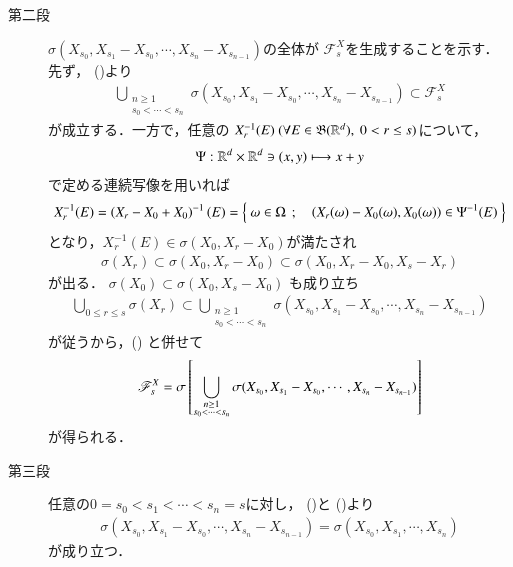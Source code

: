 \begin{prf}
\begin{description}
		\item[第二段]
			$\sigma(X_{s_0},X_{s_1}-X_{s_0},\cdots,X_{s_n} - X_{s_{n-1}})$の全体が
			$\mathscr{F}^X_s$を生成することを示す．先ず，
			()より
			\begin{align}
				\bigcup_{\substack{n \geq 1 \\ s_0 < \cdots < s_n}} 
				\sigma(X_{s_0},X_{s_1}-X_{s_0},\cdots,X_{s_n} - X_{s_{n-1}})
				\subset \mathscr{F}^X_s
				\label{eq:thm_application_dynkin_system_theorem_to_independence_3}
			\end{align}
			が成立する．一方で，任意の
			$X_r^{-1}(E)\ (\forall E \in \mathfrak{B}(\mathbb{R}^d),\ 0 < r \leq s)$について，
			\begin{align}
				\Psi:\mathbb{R}^d \times \mathbb{R}^d \ni (x,y) \longmapsto x + y
			\end{align}
			で定める連続写像を用いれば
			\begin{align}
				X_r^{-1}(E)
				= \left( X_r - X_0 + X_0 \right)^{-1}(E)
				= \left\{\ \omega \in \Omega\ \, ; \quad \left( X_r(\omega) - X_0(\omega), X_0(\omega) \right) \in \Psi^{-1}(E)\ \right\}
			\end{align}
			となり，$X_r^{-1}(E) \in \sigma(X_0, X_r - X_0)$が満たされ
			\begin{align}
				\sigma(X_r) \subset \sigma(X_0, X_r - X_0)
				\subset \sigma(X_0, X_r - X_0,X_s - X_r)
				\label{eq:thm_application_dynkin_system_theorem_to_independence_4}
			\end{align}
			が出る．
			$\sigma(X_0) \subset \sigma(X_0,X_s - X_0)$
			も成り立ち
			\begin{align}
				\bigcup_{0 \leq r \leq s} \sigma(X_r) \subset 
				\bigcup_{\substack{n \geq 1 \\ s_0 < \cdots < s_n}} \sigma(X_{s_0},X_{s_1}-X_{s_0},\cdots,X_{s_n} - X_{s_{n-1}})
			\end{align}
			が従うから，()
			と併せて
			\begin{align}
				\mathscr{F}^X_s
				= \sigma \left[\bigcup_{\substack{n \geq 1 \\ s_0 < \cdots < s_n}} \sigma(X_{s_0},X_{s_1}-X_{s_0},\cdots,X_{s_n} - X_{s_{n-1}})\right]
				\label{eq:thm_application_dynkin_system_theorem_to_independence_5}
			\end{align}
			が得られる．
		
		\item[第三段]
			任意の$0 = s_0 < s_1 < \cdots < s_n = s$に対し，
			()と
			()より
			\begin{align}
				\sigma(X_{s_0},X_{s_1}-X_{s_0},\cdots,X_{s_n} - X_{s_{n-1}})
				= \sigma(X_{s_0},X_{s_1},\cdots,X_{s_n})
				\label{eq:thm_application_dynkin_system_theorem_to_independence_6}
			\end{align}
			が成り立つ．
		

\end{description}
\end{prf}
